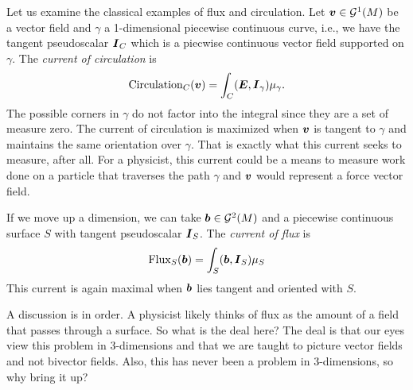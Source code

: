 \documentclass{article}
\begin{document}
Let us examine the classical examples of flux and circulation. Let $\boldsymbol{v}\in \mathcal{G}^1(M)$ be a vector field and $\gamma$ a 1-dimensional piecewise continuous curve, i.e., we have the tangent pseudoscalar $\boldsymbol{I}_C$ which is a piecwise continuous vector field supported on $\gamma$. The \emph{current of circulation} is
\begin{equation}
\label{eq:circulation_current}
    \mathrm{Circulation}_C(\boldsymbol{v}) = \int_C (\boldsymbol{E}, \boldsymbol{I}_\gamma) \mu_\gamma.
\end{equation}
The possible corners in $\gamma$ do not factor into the integral since they are a set of measure zero. The current of circulation is maximized when $\boldsymbol{v}$ is tangent to $\gamma$ and maintains the same orientation over $\gamma$. That is exactly what this current seeks to measure, after all. For a physicist, this current could be a means to measure work done on a particle that traverses the path $\gamma$ and $\boldsymbol{v}$ would represent a force vector field.

If we move up a dimension, we can take $\boldsymbol{b}\in \mathcal{G}^2(M)$ and a piecewise continuous surface $S$ with tangent pseudoscalar $\boldsymbol{I}_S$. The \emph{current of flux} is
\begin{equation}
\label{eq:flux_motivation}
    \mathrm{Flux}_S(\boldsymbol{b}) = \int_S (\boldsymbol{b},\boldsymbol{I}_S) \mu_S
\end{equation}
This current is again maximal when $\boldsymbol{b}$ lies tangent and oriented with $S$. 

A discussion is in order. A physicist likely thinks of flux as the amount of a field that passes through a surface. So what is the deal here? The deal is that our eyes view this problem in 3-dimensions and that we are taught to picture vector fields and not bivector fields. Also, this has never been a problem in 3-dimensions, so why bring it up?
\end{document}

